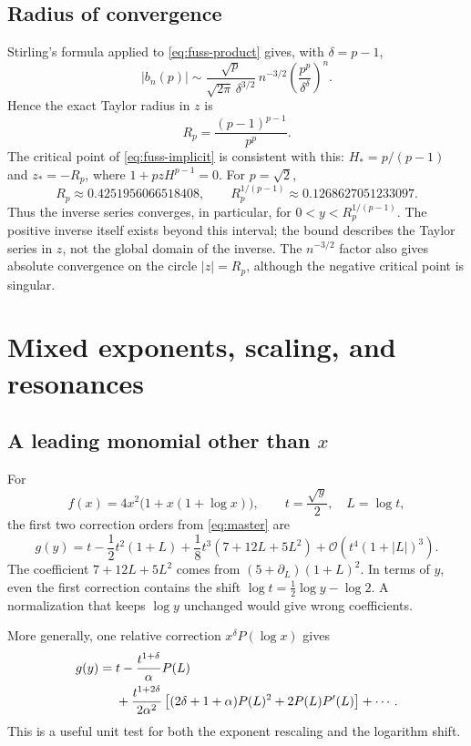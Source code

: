 \documentclass[11pt,a4paper]{article}
\numberwithin{equation}{section}
\theoremstyle{definition}\newtheorem{definition}[theorem]{Definition}
\theoremstyle{remark}\newtheorem{remark}[theorem]{Remark}
\newcommand{\bigO}{\mathcal O}
\begin{document}
\subsection{Radius of convergence}
Stirling's formula applied to \eqref{eq:fuss-product} gives, with
\(\delta=p-1\),
\begin{equation}\label{eq:coeff-asymptotic}
 |b_n(p)|\sim
 \frac{\sqrt p}{\sqrt{2\pi}\,\delta^{3/2}}\,n^{-3/2}
 \left(\frac{p^p}{\delta^\delta}\right)^n.
\end{equation}
Hence the exact Taylor radius in \(z\) is
\begin{equation}\label{eq:radius}
 R_p=\frac{(p-1)^{p-1}}{p^p}.
\end{equation}
The critical point of \eqref{eq:fuss-implicit} is consistent with this:
\(H_*=p/(p-1)\) and \(z_*=-R_p\), where
\(1+p z H^{p-1}=0\).
For \(p=\sqrt2\),
\[
 R_p\approx0.4251956066518408,
 \qquad R_p^{1/(p-1)}\approx0.1268627051233097.
\]
Thus the inverse series converges, in particular, for
\(0<y<R_p^{1/(p-1)}\). The positive inverse itself exists beyond this
interval; the bound describes the Taylor series in \(z\), not the global
domain of the inverse. The \(n^{-3/2}\) factor also gives absolute convergence
on the circle \(|z|=R_p\), although the negative critical point is singular.

\section{Mixed exponents, scaling, and resonances}
\label{sec:mixed}

\subsection{A leading monomial other than \texorpdfstring{$x$}{x}}
For
\[
 f(x)=4x^2\bigl(1+x(1+\log x)\bigr),
 \qquad t=\frac{\sqrt y}{2},\quad L=\log t,
\]
the first two correction orders from \eqref{eq:master} are
\begin{equation}\label{eq:scaled-example}
 g(y)=t-\frac12t^2(1+L)
 +\frac18t^3(7+12L+5L^2)
 +\bigO\!\left(t^4(1+|L|)^3\right).
\end{equation}
The coefficient \(7+12L+5L^2\) comes from
\((5+\partial_L)(1+L)^2\). In terms of \(y\), even the first correction
contains the shift \(\log t=\tfrac12\log y-\log2\). A normalization that
keeps \(\log y\) unchanged would give wrong coefficients.

More generally, one relative correction \(x^\delta P(\log x)\) gives
\begin{align}\label{eq:one-correction-general}
 g(y)={}&t-\frac{t^{1+\delta}}\alpha P(L)\notag\\
 &+\frac{t^{1+2\delta}}{2\alpha^2}
 \left[(2\delta+1+\alpha)P(L)^2+2P(L)P'(L)\right]+\cdots.
\end{align}
This is a useful unit test for both the exponent rescaling and the logarithm
shift.
\end{document}
